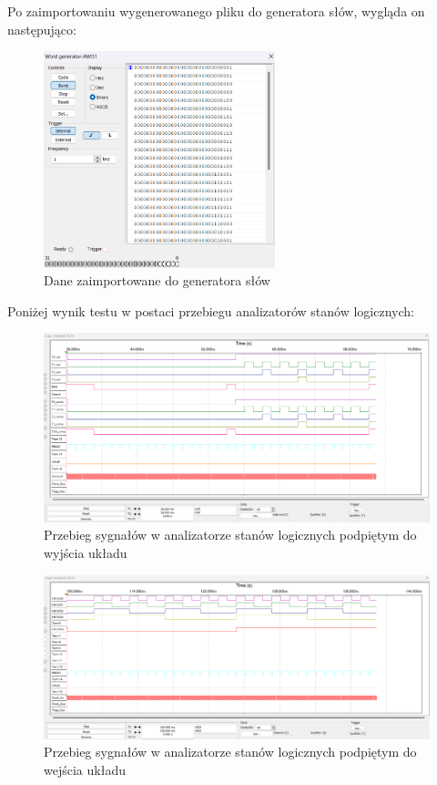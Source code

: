 \documentclass[a4paper]{article}
\begin{document}
Po zaimportowaniu wygenerowanego pliku do generatora słów, wygląda on następująco:

\begin{figure}[H]
    \centering
    \includegraphics[width=0.6\textwidth]{floor_controller_test_word_generator.png}
    \caption{Dane zaimportowane do generatora słów}
\end{figure}

Poniżej wynik testu w postaci przebiegu analizatorów stanów logicznych:

\begin{figure}[H]
    \centering
    \includegraphics[width=\textwidth]{floor_controller_test_logic_analizer_xla1.png}
    \caption{Przebieg sygnałów w analizatorze stanów logicznych podpiętym do wyjścia układu}
\end{figure}

\begin{figure}[H]
    \centering
    \includegraphics[width=\textwidth]{floor_controller_test_logic_analizer_xla2.png}
    \caption{Przebieg sygnałów w analizatorze stanów logicznych podpiętym do wejścia układu}
\end{figure}
\end{document}
